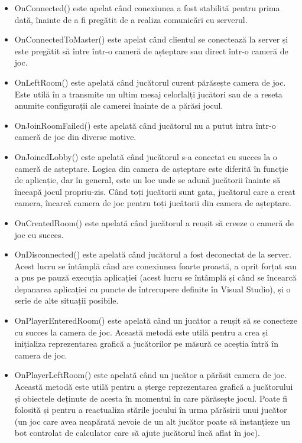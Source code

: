 \documentclass[12pt, a4paper]{article}
\begin{document}
	\begin{itemize}
		\item OnConnected() este apelat când conexiunea a fost stabilită pentru prima dată, înainte de a fi pregătit de a realiza comunicări cu serverul.
		\item OnConnectedToMaster() este apelat când clientul se conectează la server și este pregătit să între într-o cameră de așteptare sau direct într-o cameră de joc.
		\item OnLeftRoom() este apelată când jucătorul curent părăsește camera de joc. Este utilă în a transmite un ultim mesaj celorlalți jucători sau de a reseta anumite configurații ale camerei înainte de a părăsi jocul.
		\item OnJoinRoomFailed() este apelată când jucătorul nu a putut intra într-o cameră de joc din diverse motive.
		\item OnJoinedLobby() este apelată când jucătorul s-a conectat cu succes la o cameră de așteptare. Logica din camera de așteptare este diferită în funcție de aplicație, dar în general, este un loc unde se adună jucătorii înainte să înceapă jocul propriu-zis. Când toți jucătorii sunt gata, jucătorul care a creat camera, încarcă camera de joc pentru toți jucătorii din camera de așteptare.
		\item OnCreatedRoom() este apelată când jucătorul a reușit să creeze o cameră de joc cu succes.
		\item OnDisconnected() este apelată când jucătorul a fost deconectat de la server. Acest lucru se întâmplă când are conexiunea foarte proastă, a oprit forțat sau a pus pe pauză execuția aplicației (acest lucru se întâmplă și când se încearcă depanarea aplicației cu puncte de întrerupere definite în Visual Studio), și o serie de alte situații posibile.
		\item OnPlayerEnteredRoom() este apelată când un jucător a reușit să se conecteze cu succes la camera de joc. Această metodă este utilă pentru a crea și inițializa reprezentarea grafică a jucătorilor pe măsură ce aceștia întră în camera de joc.
		\item OnPlayerLeftRoom() este apelată când un jucător a părăsit camera de joc. Această metodă este utilă pentru a șterge reprezentarea grafică a jucătorului și obiectele deținute de acesta în momentul în care părăsește jocul. Poate fi folosită și pentru a reactualiza stările jocului în urma părăsirii unui jucător (un joc care avea neapărată nevoie de un alt jucător poate să instanțieze un bot controlat de calculator care să ajute jucătorul încă aflat în joc).
	\end{itemize}
	
\end{document}
